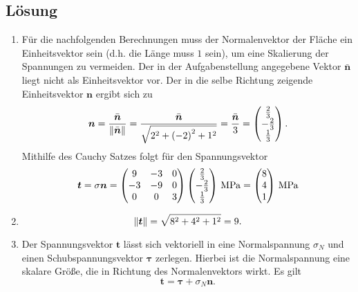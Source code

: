 \documentclass{exercise}
\begin{document}
    \subsection*{Lösung}
    \begin{enumerate}
        \item Für die nachfolgenden Berechnungen muss der Normalenvektor der Fläche ein Einheitsvektor sein (d.h. die Länge muss \(1\) sein), um eine Skalierung der Spannungen zu vermeiden.
        Der in der Aufgabenstellung angegebene Vektor \(\bar{\bm{n}}\) liegt nicht als Einheitsvektor vor.
        Der in die selbe Richtung zeigende Einheitsvektor \(\bm{n}\) ergibt sich zu
        \[
            \bm{n} = \frac{\bar{\bm{n}}}{\norm*{\bar{\bm{n}}}} = \frac{\bar{\bm{n}}}{\sqrt{2^2 + \parentheses*{-2}^2 + 1^2}} = \frac{\bar{\bm{n}}}{3} = \begin{pmatrix}
                \frac{2}{3}\\
                -\frac{2}{3}\\
                \frac{1}{3}
            \end{pmatrix}.
        \]
        Mithilfe des Cauchy Satzes folgt für den Spannungsvektor
        \[
            \bm{t} = \sigma\bm{n} = \begin{pmatrix}
                9 & -3 & 0\\
                -3 & -9 & 0\\
                0 & 0 & 3
            \end{pmatrix}\begin{pmatrix}
                \frac{2}{3}\\
                -\frac{2}{3}\\
                \frac{1}{3}
            \end{pmatrix}\sis{\mega\pascal} = \begin{pmatrix}
                8\\
                4\\
                1
            \end{pmatrix}\sis{\mega\pascal}
        \]
        \item
        \[
            \norm*{\bm{t}} = \sqrt{8^2 + 4^2 + 1^2} = 9.
        \]
        \item Der Spannungsvektor \(\bm{t}\) lässt sich vektoriell in eine Normalspannung \(\sigma_N\) und einen Schubspannungsvektor \(\bm{\tau}\) zerlegen.
        Hierbei ist die Normalspannung eine skalare Größe, die in Richtung des Normalenvektors wirkt.
        Es gilt
        \[
            \bm{t} = \bm{\tau} + \sigma_N\bm{n}.
\]
\end{enumerate}
\end{document}
